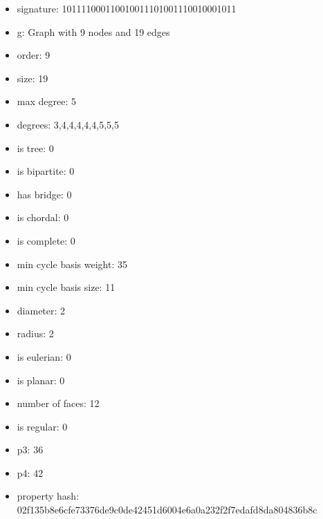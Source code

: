 \newpage
\begin{figure}
\end{figure}
\begin{itemize}
\item signature: 101111000110010011101001110010001011
\item g: Graph with 9 nodes and 19 edges
\item order: 9
\item size: 19
\item max degree: 5
\item degrees: 3,4,4,4,4,4,5,5,5
\item is tree: 0
\item is bipartite: 0
\item has bridge: 0
\item is chordal: 0
\item is complete: 0
\item min cycle basis weight: 35
\item min cycle basis size: 11
\item diameter: 2
\item radius: 2
\item is eulerian: 0
\item is planar: 0
\item number of faces: 12
\item is regular: 0
\item p3: 36
\item p4: 42
\item property hash: 02f135b8e6cfe73376de9c0de42451d6004e6a0a232f2f7edafd8da804836b8c
\end{itemize}
